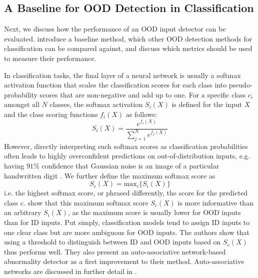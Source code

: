 \subsection{A Baseline for OOD Detection in Classification} \label{txt:softmax-confidence}

Next, we discuss how the performance of an OOD input detector can be evaluated. \textcite{ood-baseline-2016} introduce a baseline method, which other OOD detection methods for classification can be compared against, and discuss which metrics should be used to measure their performance.

\newpar In classification tasks, the final layer of a neural network is usually a softmax activation function that scales the classification scores for each class into pseudo-probability scores that are non-negative and add up to one. For a specific class $c_i$ amongst all $N$ classes, the softmax activation $S_i(X)$ is defined for the input $X$ and the class scoring functions $f_i(X)$ as follows:
\begin{equation} \label{eq:softmax}
    S_{i}(X) = \frac{e^{f_i(X)}}{\sum_{j=1}^{N}e^{f_j(X)}}
\end{equation}
However, directly interpreting such softmax scores as classification probabilities often leads to highly overconfident predictions on out-of-distribution inputs, e.g. having $91\%$ confidence that Gaussian noise is an image of a particular handwritten digit \cite{ood-baseline-2016}. We further define the maximum softmax score as
\begin{equation} \label{eq:max-softmax}
    S_{c}(X) = \text{max}_{i} \{ S_{i}(X) \}
\end{equation}
i.e. the highest softmax score, or phrased differently, the score for the predicted class $c$. \citeauthor{ood-baseline-2016} show that this maximum softmax score $S_{c}(X)$ is more informative than an arbitrary $S_{i}(X)$, as the maximum score is usually lower for OOD inputs than for ID inputs. Put simply, classification models tend to assign ID inputs to one clear class but are more ambiguous for OOD inputs. The authors show that using a threshold to distinguish between ID and OOD inputs based on $S_{c}(X)$ thus performs well. They also present an auto-associative network-based abnormality detector as a first improvement to their method. Auto-associative networks are discussed in further detail in .

